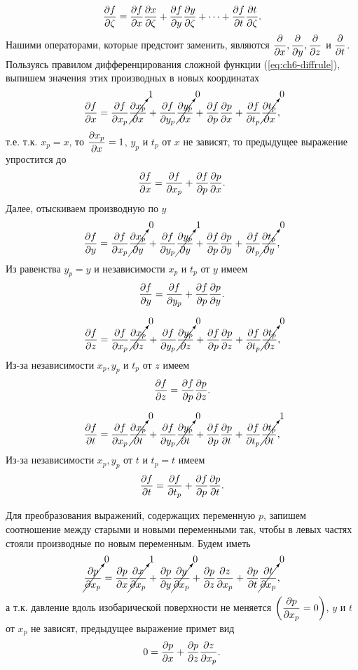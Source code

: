     \begin{equation}
        \label{eq:ch6-diffrule}
        \pd{f}{\zeta}=\pd{f}{x}\pd{x}{\zeta}+\pd{f}{y}\pd{y}{\zeta}+\cdots+\pd{f}{t}\pd{t}{\zeta}.
    \end{equation}
    Нашими операторами, которые предстоит заменить, являются $\pd{}{x},\pd{}{y},\pd{}{z}$ и $\pd{}{t}$. Пользуясь правилом дифференцирования сложной функции (\ref{eq:ch6-diffrule}), выпишем значения этих производных в новых координатах
    \[
    \pd{f}{x}=\pd{f}{x_p}\cancelto{1}{\pd{x_p}{x}}+\pd{f}{y_p}\cancelto{0}{\pd{y_p}{x}}+\pd{f}{p}\pd{p}{x}+\pd{f}{t_p}\cancelto{0}{\pd{t_p}{x}},
    \]
    т.е. т.к. $x_p=x$, то $\pd{x_p}{x}=1$, $y_p$ и $t_p$ от $x$ не зависят, то предыдущее выражение упростится до
    \begin{equation}
        \label{eq:fx2p}
        \pd{f}{x}=\pd{f}{x_p}+\pd{f}{p}\pd{p}{x}.
    \end{equation}
    Далее, отыскиваем производную по $y$
    \[
    \pd{f}{y}=\pd{f}{x_p}\cancelto{0}{\pd{x_p}{y}}+\pd{f}{y_p}\cancelto{1}{\pd{y_p}{y}}+\pd{f}{p}\pd{p}{y}+\pd{f}{t_p}\cancelto{0}{\pd{t_p}{y}},
    \]
    Из равенства $y_p=y$ и независимости $x_p$ и $t_p$ от $y$ имеем
    \begin{equation}
        \label{eq:fy2p}
        \pd{f}{y}=\pd{f}{y_p}+\pd{f}{p}\pd{p}{y}.
    \end{equation}

    \[
    \pd{f}{z}=\pd{f}{x_p}\cancelto{0}{\pd{x_p}{z}}+\pd{f}{y_p}\cancelto{0}{\pd{y_p}{z}}+\pd{f}{p}\pd{p}{z}+\pd{f}{t_p}\cancelto{0}{\pd{t_p}{z}},
    \]
    Из-за независимости $x_p,y_p$ и $t_p$ от $z$ имеем
    \begin{equation}
        \label{eq:fz2p}
        \pd{f}{z}=\pd{f}{p}\pd{p}{z}.
    \end{equation}

    \[
    \pd{f}{t}=\pd{f}{x_p}\cancelto{0}{\pd{x_p}{t}}+\pd{f}{y_p}\cancelto{0}{\pd{y_p}{t}}+\pd{f}{p}\pd{p}{t}+\pd{f}{t_p}\cancelto{1}{\pd{t_p}{t}},
    \]
    Из-за независимости $x_p,y_p$ от $t$ и $t_p=t$ имеем
    \begin{equation}
        \label{eq:ft2p}
        \pd{f}{t}=\pd{f}{t_p}+\pd{f}{p}\pd{p}{t}.
    \end{equation}

    Для преобразования выражений, содержащих переменную $p$, запишем соотношение между старыми и новыми переменными так, чтобы в левых частях стояли производные по новым переменным. Будем иметь
    \[
    \cancelto{0}{\pd{p}{x_p}}=\pd{p}{x}\cancelto{1}{\pd{x}{x_p}}+\pd{p}{y}\cancelto{0}{\pd{y}{x_p}}+\pd{p}{z}\pd{z}{x_p}+\pd{p}{t}\cancelto{0}{\pd{t}{x_p}},
    \]
    а т.к. давление вдоль изобарической поверхности не меняется $\left(\pd{p}{x_p}=0\right)$, $y$ и $t$ от $x_p$ не зависят, предыдущее выражение примет вид
    \begin{equation}
        \label{eq:ch6-px2p}
        0=\pd{p}{x}+\pd{p}{z}\pd{z}{x_p}.
    \end{equation}

